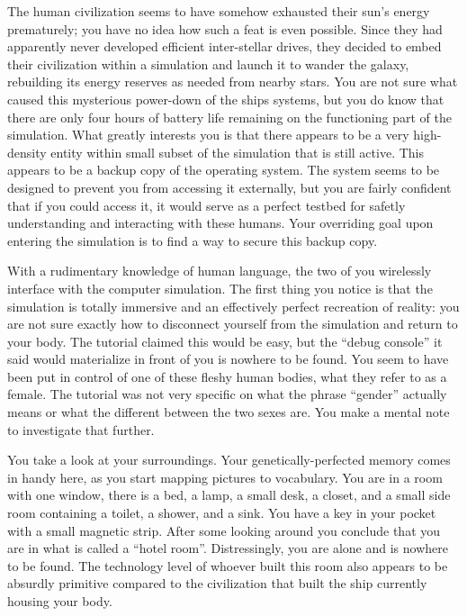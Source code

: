 \documentclass[char]{guildcamp1}
\begin{document}
The human civilization seems to have somehow exhausted their sun's energy prematurely; you have no idea how such a feat is even possible. Since they had apparently never developed efficient inter-stellar drives, they decided to embed their civilization within a simulation and launch it to wander the galaxy, rebuilding its energy reserves as needed from nearby stars. You are not sure what caused this mysterious power-down of the ships systems, but you do know that there are only four hours of battery life remaining on the functioning part of the simulation. What greatly interests you is that there appears to be a very high-density entity within small subset of the simulation that is still active. This appears to be a backup copy of the operating system. The system seems to be designed to prevent you from accessing it externally, but you are fairly confident that if you could access it, it would serve as a perfect testbed for safetly understanding and interacting with these humans. Your overriding goal upon entering the simulation is to find a way to secure this backup copy.

With a rudimentary knowledge of human language, the two of you wirelessly interface with the computer simulation. The first thing you notice is that the simulation is totally immersive and an effectively perfect recreation of reality: you are not sure exactly how to disconnect yourself from the simulation and return to your body. The tutorial claimed this would be easy, but the ``debug console'' it said would materialize in front of you is nowhere to be found. You seem to have been put in control of one of these fleshy human bodies, what they refer to as a female. The tutorial was not very specific on what the phrase ``gender'' actually means or what the different between the two sexes are. You make a mental note to investigate that further.

You take a look at your surroundings. Your genetically-perfected memory comes in handy here, as you start mapping pictures to vocabulary. You are in a room with one window, there is a bed, a lamp, a small desk, a closet, and a small side room containing a toilet, a shower, and a sink. You have a key in your pocket with a small magnetic strip. After some looking around you conclude that you are in what is called a ``hotel room''. Distressingly, you are alone and \cActive{\they} is nowhere to be found. The technology level of whoever built this room also appears to be absurdly primitive compared to the civilization that built the ship currently housing your body.
\end{document}
